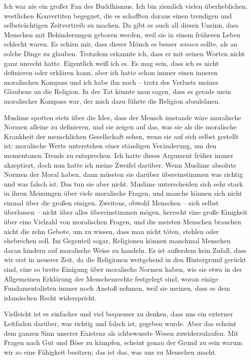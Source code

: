 \documentclass[12pt]{memoir}
\begin{document}
Ich war nie ein großer Fan des Buddhismus.
Ich bin ziemlich vielen überheblichen, westlichen Konvertiten begegnet,
die es schafften daraus einen trendigen und selbstsüchtigen
Zeitvertreib zu machen.
Da gibt es auch all diesen Unsinn,
dass Menschen mit Behinderungen geboren werden,
weil sie in einem früheren Leben schlecht waren.
Es schien mir, dass dieser Mönch es besser \emph{wissen} sollte,
als an solche Dinge zu glauben.
Trotzdem erkannte ich, dass er mit seinen Worten nicht ganz unrecht hatte.
Eigentlich weiß ich es.
Es mag sein, dass ich es nicht definieren oder erklären kann,
aber ich hatte schon immer einen inneren moralischen Kompass
und ich habe ihn noch –
trotz des Verlusts meines Glaubens an die Religion.
In der Tat könnte man sagen, dass es gerade mein moralischer Kompass war,
der mich dazu führte die Religion abzulehnen.

Muslime spotten stets über die Idee,
dass der Mensch imstande wäre moralische Normen alleine zu definieren,
und sie zeigen auf das, was sie als die moralische Krankheit
der menschlichen Gesellschaft sehen, wenn sie auf sich selbst gestellt ist;
moralische Werte unterstehen einer ständigen Veränderung,
um den momentanen Trends zu entsprechen.
Ich hatte dieses Argument früher immer akzeptiert,
doch nun hatte ich meine Zweifel darüber.
Wenn Muslime absolute Normen der Moral haben,
dann müssten sie darüber übereinstimmen was richtig und was falsch ist.
Das tun sie aber nicht.
Muslime unterscheiden sich sehr stark in ihren Meinungen
über viele moralische Fragen,
und manche können sich nicht einmal über die großen einigen.
Zweitens, obwohl Menschen – sich selbst überlassen –
nicht über alles übereinstimmen mögen,
herrscht eine große Einigkeit über eine Vielzahl von moralischen Fragen,
und die meisten Menschen brauchen nicht die zehn Gebote,
um zu wissen, dass man nicht töten, stehlen oder ehebrechen soll.
Im Gegenteil sogar, Religionen können manchmal Menschen daran hindern
auf moralische Weise zu handeln.
Es ist außerdem kein Zufall, dass wir erst in neuerer Zeit,
da die Religionen weitgehend in den Hintergrund gerückt sind,
eine so breite Einigung über moralische Normen haben,
wie sie etwa in der Allgemeinen Erklärung der Menschenrechte festgelegt sind,
woran einige Fundamentalisten immer noch Anstoß nehmen,
weil sie meinen, dass es dem islamischen Recht widerspricht.

Vielleicht ist es einfacher und viel bequemer zu denken,
dass uns ein externer Leitfaden darüber,
was richtig und falsch ist, gegeben wurde.
Aber das scheint dem ganzen Sinn unserer Existenz
als ichbewusste Wesen zuwiderzulaufen.
Mit Fragen nach Gut und Böse zu kämpfen,
scheint genau der Grund zu sein warum wir so eine Fähigkeit besitzen;
das ist das, was uns zu Menschen macht.
\end{document}

